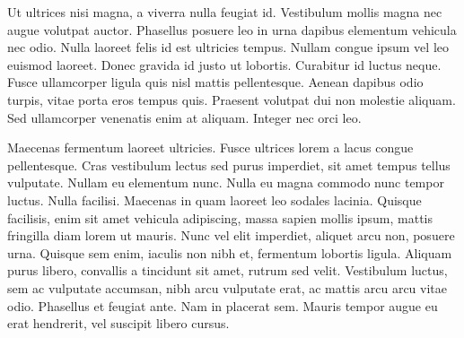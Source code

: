 Ut ultrices nisi magna, a viverra nulla feugiat id. Vestibulum mollis magna nec augue volutpat auctor. Phasellus posuere leo in urna dapibus elementum vehicula nec odio. Nulla laoreet felis id est ultricies tempus. Nullam congue ipsum vel leo euismod laoreet. Donec gravida id justo ut lobortis. Curabitur id luctus neque. Fusce ullamcorper ligula quis nisl mattis pellentesque. Aenean dapibus odio turpis, vitae porta eros tempus quis. Praesent volutpat dui non molestie aliquam. Sed ullamcorper venenatis enim at aliquam. Integer nec orci leo.

Maecenas fermentum laoreet ultricies. Fusce ultrices lorem a lacus congue pellentesque. Cras vestibulum lectus sed purus imperdiet, sit amet tempus tellus vulputate. Nullam eu elementum nunc. Nulla eu magna commodo nunc tempor luctus. Nulla facilisi. Maecenas in quam laoreet leo sodales lacinia. Quisque facilisis, enim sit amet vehicula adipiscing, massa sapien mollis ipsum, mattis fringilla diam lorem ut mauris. Nunc vel elit imperdiet, aliquet arcu non, posuere urna. Quisque sem enim, iaculis non nibh et, fermentum lobortis ligula. Aliquam purus libero, convallis a tincidunt sit amet, rutrum sed velit. Vestibulum luctus, sem ac vulputate accumsan, nibh arcu vulputate erat, ac mattis arcu arcu vitae odio. Phasellus et feugiat ante. Nam in placerat sem. Mauris tempor augue eu erat hendrerit, vel suscipit libero cursus.